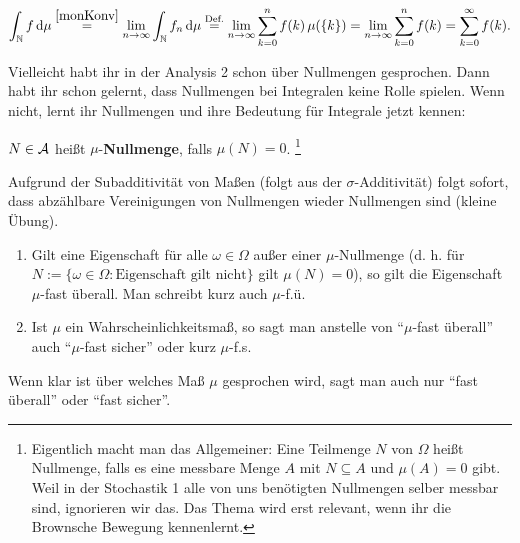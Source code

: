 \begin{beispiel}
\begin{itemize}
		\begin{align*}
			\int_{\mathbb{N}} f\, \mathrm{d}\mu\overset{\eqref{monKonv}}{=} \lim_{n\to\infty} \int_{\mathbb{N}} f_n\, \mathrm{d}\mu\overset{\text{Def.}}{=}\lim_{n\to\infty} \sum_{k=0}^n f(k)\, \mu(\{k\})=\lim_{n\to\infty} \sum_{k=0}^n f(k)= \sum_{k=0}^\infty f(k).
		\end{align*}				
	\end{itemize}
\end{beispiel}
Vielleicht habt ihr in der Analysis 2 schon \"uber Nullmengen gesprochen. Dann habt ihr schon gelernt, dass Nullmengen bei Integralen keine Rolle spielen. Wenn nicht, lernt ihr Nullmengen und ihre Bedeutung f\"ur Integrale jetzt kennen:
\begin{deff}
	$ N \in \mathcal{A}$ heißt $ \mu $-\textbf{Nullmenge}, falls $ \mu (N) = 0$. \footnote{Eigentlich macht man das Allgemeiner: Eine Teilmenge $N$ von $\Omega$ hei\ss t Nullmenge, falls es eine messbare Menge $A$ mit $N\subseteq A$ und $\mu(A)=0$ gibt. Weil in der Stochastik 1 alle von uns ben\"otigten Nullmengen selber messbar sind, ignorieren wir das. Das Thema wird erst relevant, wenn ihr die Brownsche Bewegung kennenlernt.
	}
\end{deff}
Aufgrund der Subadditivit\"at von Ma\ss en (folgt aus der $\sigma$-Additivit\"at) folgt sofort, dass abz\"ahlbare Vereinigungen von Nullmengen wieder Nullmengen sind (kleine \"Ubung).



\begin{deff}
	\begin{enumerate}[label=(\roman*)]
		\item Gilt eine Eigenschaft für alle $\omega \in \Omega$ außer einer $\mu$-Nullmenge (d. h. f\"ur $N:=\{\omega \in \Omega: \text{Eigenschaft gilt nicht}\}$ gilt $\mu(N)=0$), so gilt die Eigenschaft $\mu$-fast überall. Man schreibt kurz auch $\mu$-f.\"u.
		\item Ist $\mu$ ein Wahrscheinlichkeitsmaß, so sagt man anstelle von \enquote{$\mu$-fast überall} auch \enquote{$\mu$-fast sicher} oder kurz $\mu$-f.s.
	\end{enumerate}
\end{deff}
Wenn klar ist \"uber welches Ma\ss{} $\mu$ gesprochen wird, sagt man auch nur \enquote{fast \"uberall} oder \enquote{fast sicher}.\smallskip
\marginpar{\textcolor{red}{Vorlesung 11}}

